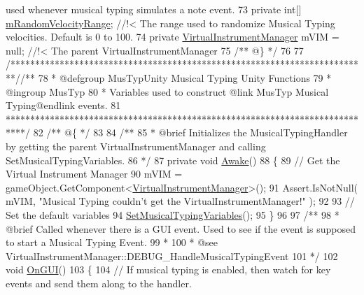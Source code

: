 \begin{DoxyCodeInclude}
{       used whenever musical typing simulates a note event.}
73 \textcolor{comment}{}    \textcolor{keyword}{private} \textcolor{keywordtype}{int}[]                         \hyperlink{group___mus_typ_priv_var_ga15df83911d88e77e46726ff5642d04e6}{mRandomVelocityRange}; \textcolor{comment}{//!< The range used to
       randomize Musical Typing velocities. Default is 0 to 100.}
74 \textcolor{comment}{}    \textcolor{keyword}{private} \hyperlink{class_virtual_instrument_manager}{VirtualInstrumentManager}      mVIM = null; \textcolor{comment}{//!< The parent
       VirtualInstrumentManager}
75 \textcolor{comment}{}\textcolor{comment}{    /** @\} */}
76 
77     \textcolor{comment}{/*************************************************************************/}\textcolor{comment}{/** }
78 \textcolor{comment}{    * @defgroup MusTypUnity Musical Typing Unity Functions}
79 \textcolor{comment}{    * @ingroup MusTyp}
80 \textcolor{comment}{    * Variables used to construct @link MusTyp Musical Typing@endlink events.}
81 \textcolor{comment}{    ****************************************************************************/}\textcolor{comment}{}
82 \textcolor{comment}{    /** @\{ */}
83 \textcolor{comment}{}
84 \textcolor{comment}{    /**}
85 \textcolor{comment}{     * @brief Initializes the MusicalTypingHandler by getting the parent VirtualInstrumentManager and
       calling SetMusicalTypingVariables.}
86 \textcolor{comment}{    */}
87     \textcolor{keyword}{private} \textcolor{keywordtype}{void} \hyperlink{group___mus_typ_unity_ga2935e4d4209f57f19ea242968c861f3f}{Awake}()
88     \{
89         \textcolor{comment}{// Get the Virtual Instrument Manager}
90         mVIM = gameObject.GetComponent<\hyperlink{class_virtual_instrument_manager}{VirtualInstrumentManager}>();
91         Assert.IsNotNull( mVIM, \textcolor{stringliteral}{"Musical Typing couldn't get the VirtualInstrumentManager!"} );
92 
93         \textcolor{comment}{// Set the default variables}
94         \hyperlink{group___mus_typ_priv_func_ga5db8ab750574dbc31279827ea5cc501e}{SetMusicalTypingVariables}();
95     \}
96 \textcolor{comment}{}
97 \textcolor{comment}{    /**}
98 \textcolor{comment}{     * @brief Called whenever there is a GUI event. Used to see if the event is supposed to start a Musical
       Typing Event.}
99 \textcolor{comment}{     * }
100 \textcolor{comment}{     * @see VirtualInstrumentManager::DEBUG\_HandleMusicalTypingEvent}
101 \textcolor{comment}{    */}
102     \textcolor{keywordtype}{void} \hyperlink{group___mus_typ_unity_ga13a20522cf119917cb41e21051122977}{OnGUI}()
103     \{
104         \textcolor{comment}{// If musical typing is enabled, then watch for key events and send them along to the handler.}

\end{DoxyCodeInclude}
